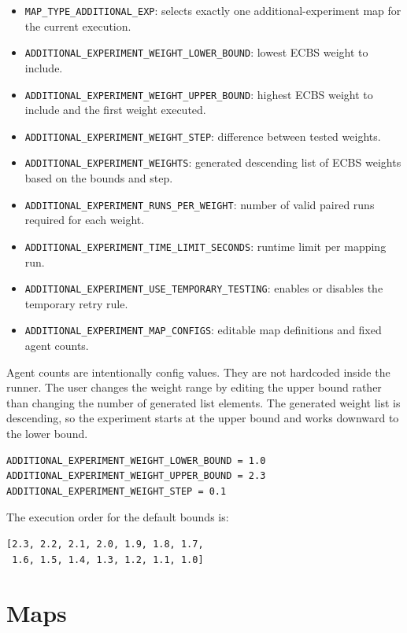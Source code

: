 \documentclass[11pt]{article}
\begin{document}
\begin{itemize}[leftmargin=2em]
    \item \texttt{MAP\_TYPE\_ADDITIONAL\_EXP}: selects exactly one additional-experiment map for the current execution.
    \item \texttt{ADDITIONAL\_EXPERIMENT\_WEIGHT\_LOWER\_BOUND}: lowest ECBS weight to include.
    \item \texttt{ADDITIONAL\_EXPERIMENT\_WEIGHT\_UPPER\_BOUND}: highest ECBS weight to include and the first weight executed.
    \item \texttt{ADDITIONAL\_EXPERIMENT\_WEIGHT\_STEP}: difference between tested weights.
    \item \texttt{ADDITIONAL\_EXPERIMENT\_WEIGHTS}: generated descending list of ECBS weights based on the bounds and step.
    \item \texttt{ADDITIONAL\_EXPERIMENT\_RUNS\_PER\_WEIGHT}: number of valid paired runs required for each weight.
    \item \texttt{ADDITIONAL\_EXPERIMENT\_TIME\_LIMIT\_SECONDS}: runtime limit per mapping run.
    \item \texttt{ADDITIONAL\_EXPERIMENT\_USE\_TEMPORARY\_TESTING}: enables or disables the temporary retry rule.
    \item \texttt{ADDITIONAL\_EXPERIMENT\_MAP\_CONFIGS}: editable map definitions and fixed agent counts.
\end{itemize}

Agent counts are intentionally config values. They are not hardcoded inside the runner. The user changes the weight range by editing the upper bound rather than changing the number of generated list elements. The generated weight list is descending, so the experiment starts at the upper bound and works downward to the lower bound.

\begin{lstlisting}
ADDITIONAL_EXPERIMENT_WEIGHT_LOWER_BOUND = 1.0
ADDITIONAL_EXPERIMENT_WEIGHT_UPPER_BOUND = 2.3
ADDITIONAL_EXPERIMENT_WEIGHT_STEP = 0.1
\end{lstlisting}

The execution order for the default bounds is:

\begin{lstlisting}
[2.3, 2.2, 2.1, 2.0, 1.9, 1.8, 1.7,
 1.6, 1.5, 1.4, 1.3, 1.2, 1.1, 1.0]
\end{lstlisting}

\section{Maps}
\end{document}
